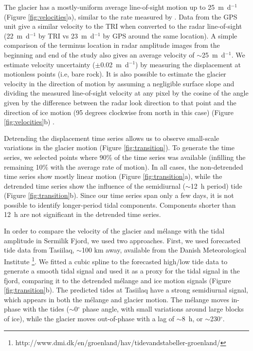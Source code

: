 \documentclass[review]{igs}
\begin{document}
The glacier has a mostly-uniform average line-of-sight motion up to 25~m~d$^{-1}$ (Figure \ref{fig:velocities}a), similar to the rate measured by \citet{de2010sudden}. Data from the GPS unit give a similar velocity to the TRI when converted to the radar line-of-sight (22~m~d$^{-1}$ by TRI vs 23~m~d$^{-1}$ by GPS around the same location). A simple comparison of the terminus location in radar amplitude images from the beginning and  end of the study also gives an average velocity of $\sim$25~m~d$^{-1}$. We estimate velocity uncertainty ($\pm$0.02~m~d$^{-1}$) by measuring the displacement at motionless points (i.e, bare rock). It is also possible to estimate the glacier velocity in the direction of motion by assuming a negligible surface slope and dividing the measured line-of-sight velocity at any pixel by the cosine of the angle given by the difference between the radar look direction to that point and the direction of ice motion (95 degrees clockwise from north in this case) (Figure \ref{fig:velocities}b) \citep{voytenko2014}.


Detrending the displacement time series allows us to observe small-scale variations in the glacier motion (Figure \ref{fig:transition}). To generate the time series, we selected points where 90\% of the time series was available (infilling the remaining 10\% with the average rate of motion). In all cases, the non-detrended time series show mostly linear motion (Figure \ref{fig:transition}a), while the detrended time series show the influence of the semidiurnal ($\sim$12~h period) tide (Figure \ref{fig:transition}b).  Since our time series span only a few days, it is not possible to identify longer-period tidal components.  Components shorter than 12~h are not significant in the detrended time series.



In order to compare the velocity of the glacier and m\'elange with the tidal amplitude in Sermilik Fjord, we used two approaches. First, we used forecasted tide data from Tasiilaq, $\sim$100 km away, available from the Danish Meteorological Institute \footnote{http://www.dmi.dk/en/groenland/hav/tidevandstabeller-groenland/}. We fitted a cubic spline to the forecasted high/low tide data to generate a smooth tidal signal and used it as a proxy for the tidal signal in the fjord, comparing it to the detrended m\'elange and ice motion signals (Figure \ref{fig:transition}b). The predicted tides at Tasiilaq have a strong semidiurnal signal, which appears in both the m\'elange and glacier motion. The m\'elange moves in-phase with the tides ($\sim$0$^{\circ}$ phase angle, with small variations around large blocks of ice), while the glacier moves out-of-phase with a lag of $\sim$8~h, or $\sim$230$^{\circ}$. 
\end{document}
